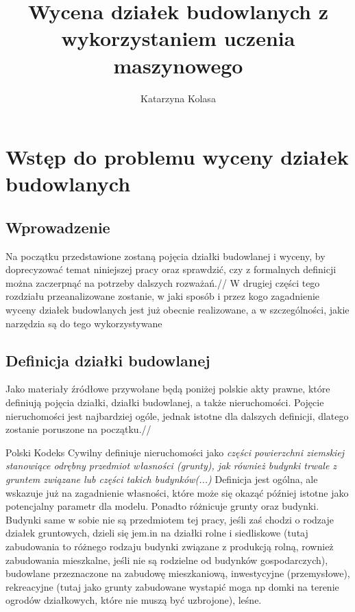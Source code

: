 \documentclass[a4paper,12pt,twoside,openany]{report}
\title{Wycena działek budowlanych z wykorzystaniem uczenia maszynowego}
\author{Katarzyna Kolasa}
\begin{document}
\maketitle

\chapter{Wstęp do problemu wyceny działek budowlanych}

\section{Wprowadzenie}
Na początku przedstawione zostaną pojęcia działki budowlanej i wyceny, by doprecyzować temat niniejszej pracy oraz sprawdzić, czy z formalnych definicji można zaczerpnąć na potrzeby dalszych rozważań.//
W drugiej części tego rozdziału przeanalizowane zostanie, w jaki sposób i przez kogo zagadnienie wyceny działek budowlanych jest już obecnie realizowane, a w szczególności, jakie narzędzia są do tego wykorzystywane


\section{Definicja działki budowlanej}
Jako materiały źródłowe przywołane będą poniżej polskie akty prawne, które definiują pojęcia działki, działki budowlanej, a także nieruchomości. Pojęcie nieruchomości jest najbardziej ogóle, jednak istotne dla dalszych definicji, dlatego zostanie poruszone na początku.//

 Polski Kodeks Cywilny definiuje nieruchomości jako
\textit { części powierzchni ziemskiej stanowiące odrębny przedmiot własności (grunty), jak również budynki trwale z gruntem związane lub części takich budynków(...)} \cite{KC}
Definicja jest ogólna, ale wskazuje już na zagadnienie własności, które może się okaząć później istotne jako potencjalny parametr dla modelu. Ponadto różnicuje grunty oraz budynki. Budynki same w sobie nie są przedmiotem tej pracy, jeśli zaś chodzi o rodzaje działek gruntowych, dzieli się jem.in  na działki rolne i siedliskowe (tutaj zabudowania to różnego rodzaju budynki związane z produkcją rolną, rownież zabudowania mieszkalne, jeśli nie są rodzielne od budynków gospodarczych), budowlane przeznaczone na zabudowę mieszkaniową,  inwestycyjne (przemysłowe), rekreacyjne (tutaj jako grunty zabudowane wystapić moga np domki na terenie ogrodów działkowych, które nie muszą być uzbrojone), leśne. \cite{RMRPiTegb}\\
\end{document}
